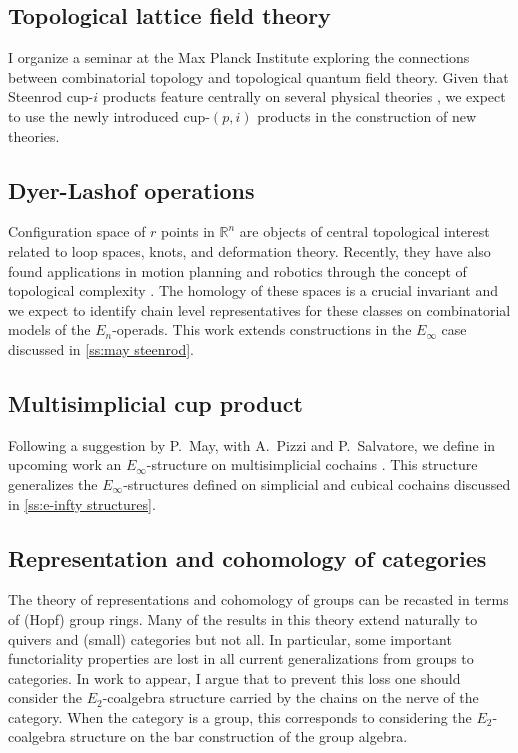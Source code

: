 \subsection{Topological lattice field theory}

I organize a seminar at the Max Planck Institute exploring the connections between combinatorial topology and topological quantum field theory.
Given that Steenrod cup-$i$ products feature centrally on several physical theories \cite{gaiotto2016spin, bhardwaj2017fermionic, kapustin2017fermionic}, we expect to use the newly introduced cup-$(p,i)$ products in the construction of new theories.

\subsection{Dyer-Lashof operations}

Configuration space of $r$ points in $\mathbb R^n$ are objects of central topological interest related to loop spaces, knots, and deformation theory.
Recently, they have also found applications in motion planning and robotics through the concept of topological complexity \cite{farber2003motion.planning}.
The homology of these spaces is a crucial invariant and we expect to identify chain level representatives for these classes on combinatorial models of the $E_n$-operads.
This work extends constructions in the $E_\infty$ case discussed in \cref{ss:may steenrod}.

\subsection{Multisimplicial cup product}

Following a suggestion by P.~May, with A.~Pizzi and P.~Salvatore, we define in upcoming work an $E_\infty$-structure on multisimplicial cochains \cite{medina2021multisimplicial}.
This structure generalizes the $E_\infty$-structures defined on simplicial and cubical cochains discussed in \cref{ss:e-infty structures}.

\subsection{Representation and cohomology of categories}

The theory of representations and cohomology of groups can be recasted in terms of (Hopf) group rings.
Many of the results in this theory extend naturally to quivers and (small) categories but not all.
In particular, some important functoriality properties are lost in all current generalizations from groups to categories.
In work to appear, I argue that to prevent this loss one should consider the $E_2$-coalgebra structure carried by the chains on the nerve of the category.
When the category is a group, this corresponds to considering the $E_2$-coalgebra structure on the bar construction of the group algebra.

